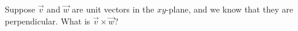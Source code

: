 \begin{problem}
Suppose $\vec{v}$ and $\vec{w}$ are unit vectors in the $xy$-plane, and we know that they are perpendicular. What is $\vec{v}\times\vec{w}$?
\begin{multipleChoice}
\end{multipleChoice}
\end{problem}